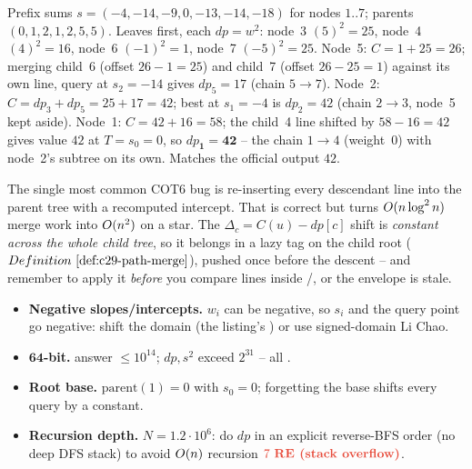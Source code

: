 \begin{tracebox}
Prefix sums \(s=(-4,-14,-9,0,-13,-14,-18)\) for nodes \(1..7\); parents
\((0,1,2,1,2,5,5)\).  Leaves first, each \(\mathit{dp}=w^2\): node~3
\((5)^2{=}25\), node~4 \((4)^2{=}16\), node~6 \((-1)^2{=}1\), node~7
\((-5)^2{=}25\).  Node~5: \(C{=}1{+}25{=}26\); merging child~6 (offset
\(26{-}1{=}25\)) and child~7 (offset \(26{-}25{=}1\)) against its own line,
query at \(s_2{=}-14\) gives \(\mathit{dp}_5{=}17\) (chain \(5\!\to\!7\)).
Node~2: \(C{=}\mathit{dp}_3{+}\mathit{dp}_5{=}25{+}17{=}42\); best at
\(s_1{=}-4\) is \(\mathit{dp}_2{=}42\) (chain \(2\!\to\!3\), node~5 kept aside).
Node~1: \(C{=}42{+}16{=}58\); the child~4 line shifted by \(58{-}16{=}42\) gives
value \(42\) at \(T{=}s_0{=}0\), so \(\mathbf{\mathit{dp}_1=42}\) -- the chain
\(1\!\to\!4\) (weight~0) with node~2's subtree on its own.  Matches the official
output \(42\).
\end{tracebox}

\begin{warningbox}
The single most common COT6 bug is re-inserting every descendant line into the
parent tree with a recomputed intercept.  That is correct but turns
\(O(n\log^2 n)\) merge work into \(O(n^2)\) on a star.  The
\(\Delta_c=C(u)-\mathit{dp}[c]\) shift is \emph{constant across the whole child
tree}, so it belongs in a lazy tag on the child root (\(\defref{c29-path-merge}\)),
pushed once before the descent -- and remember to apply it \emph{before} you
compare lines inside /, or the envelope is stale.
\end{warningbox}

\begin{hardeningbox}
\begin{itemize}[nosep,leftmargin=1.4em]
  \item \textbf{Negative slopes/intercepts.} \(w_i\) can be negative, so
        \(s_i\) and the query point go negative: shift the domain (the listing's
        ) or use signed-domain Li Chao.
  \item \textbf{\(\mathbf{64}\)-bit.} answer \(\le10^{14}\); \(\mathit{dp},s^2\)
        exceed \(2^{31}\) -- all .
  \item \textbf{Root base.} \(\text{parent}(1)=0\) with \(s_0=0\); forgetting the
        base shifts every query by a constant.
  \item \textbf{Recursion depth.} \(N=1.2\cdot10^{6}\): do \(\mathit{dp}\) in an
        explicit reverse-BFS order (no deep DFS stack) to avoid \(O(n)\)
        recursion \(\re\).
\end{itemize}
\end{hardeningbox}

